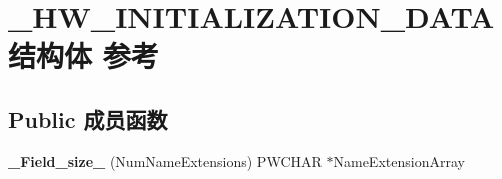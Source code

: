 \hypertarget{struct___h_w___i_n_i_t_i_a_l_i_z_a_t_i_o_n___d_a_t_a}{}\section{\+\_\+\+H\+W\+\_\+\+I\+N\+I\+T\+I\+A\+L\+I\+Z\+A\+T\+I\+O\+N\+\_\+\+D\+A\+T\+A结构体 参考}
\label{struct___h_w___i_n_i_t_i_a_l_i_z_a_t_i_o_n___d_a_t_a}
\subsection*{Public 成员函数}
\begin{DoxyCompactItemize}
\item 
\mbox{\label{struct___h_w___i_n_i_t_i_a_l_i_z_a_t_i_o_n___d_a_t_a_a2fd13a162297007701b2bb34efbb2a69}} 
{\bfseries \+\_\+\+Field\+\_\+size\+\_\+} (Num\+Name\+Extensions) P\+W\+C\+H\+AR $\ast$Name\+Extension\+Array
\end{DoxyCompactItemize}
